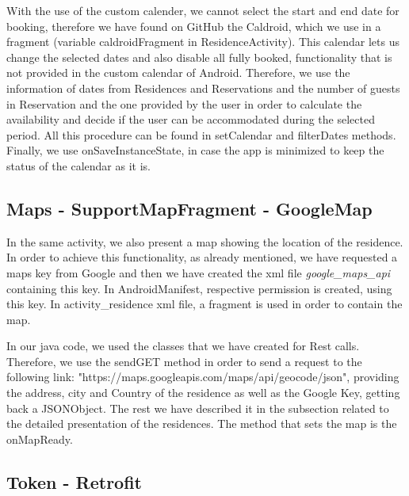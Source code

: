 \documentclass[12pt]{article}
\begin{document}
	With the use of the custom calender, we cannot select the start and end date for booking, therefore we have found on GitHub the Caldroid, which we use in a fragment (variable caldroidFragment in ResidenceActivity). This calendar lets us change the selected dates and also disable all fully booked, functionality that is not provided in the custom calendar of Android. Therefore, we use the information of dates from Residences and Reservations and the number of guests in Reservation and the one provided by the user in order to calculate the availability and decide if the user can be accommodated during the selected period. All this procedure can be found in setCalendar and filterDates methods. Finally, we use onSaveInstanceState, in case the app is minimized to keep the status of the calendar as it is.
	
	\subsection{Maps - SupportMapFragment - GoogleMap}
	
	In the same activity, we also present a map showing the location of the residence. In order to achieve this functionality, as already mentioned, we have requested a maps key from Google and then we have created the xml file \textit{google\_maps\_api} containing this key. In AndroidManifest, respective permission is created, using this key. In activity\_residence xml file, a fragment is used in order to contain the map.
	
	In our java code, we used the classes that we have created for Rest calls. Therefore, we use the sendGET method in order to send a request to the following link: \newline "https://maps.googleapis.com/maps/api/geocode/json", providing the address, city and Country of the residence as well as the Google Key, getting back a JSONObject. The rest we have described it in the subsection related to the detailed presentation of the residences. The method that sets the map is the onMapReady.
	
	\subsection{Token - Retrofit}
	
\end{document}
